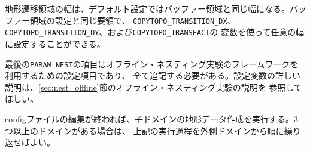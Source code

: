地形遷移領域の幅は、デフォルト設定ではバッファー領域と同じ幅になる。バッファー領域の設定と同じ要領で、
\verb|COPYTOPO_TRANSITION_DX|、\verb|COPYTOPO_TRANSITION_DY|、および\verb|COPYTOPO_TRANSFACT|の
変数を使って任意の幅に設定することができる。

最後の\verb|PARAM_NEST|の項目はオフライン・ネスティング実験のフレームワークを利用するための設定項目であり、
全て追記する必要がある。設定変数の詳しい説明は、\ref{sec:nest_offline}節のオフライン・ネスティング実験の説明を
参照してほしい。

configファイルの編集が終われば、子ドメインの地形データ作成を実行する。3つ以上のドメインがある場合は、
上記の実行過程を外側ドメインから順に繰り返せばよい。



